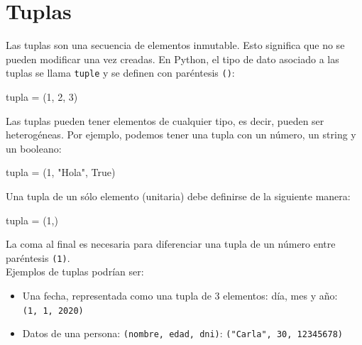 \documentclass[
  letterpaper,
  DIV=11,
  numbers=noendperiod]{scrreprt}
\newenvironment{Shaded}{\begin{snugshade}}{\end{snugshade}}
\newcommand{\DecValTok}[1]{\textcolor[rgb]{0.68,0.00,0.00}{#1}}
\newcommand{\NormalTok}[1]{\textcolor[rgb]{0.00,0.23,0.31}{#1}}
\newcommand{\OperatorTok}[1]{\textcolor[rgb]{0.37,0.37,0.37}{#1}}
\newcommand{\StringTok}[1]{\textcolor[rgb]{0.13,0.47,0.30}{#1}}
\newcommand{\VariableTok}[1]{\textcolor[rgb]{0.07,0.07,0.07}{#1}}
\providecommand{\tightlist}{%
  \setlength{\itemsep}{0pt}\setlength{\parskip}{0pt}}\usepackage{longtable,booktabs,array}
\begin{document}
\hypertarget{tuplas}{%
\section{Tuplas}\label{tuplas}}

Las tuplas son una secuencia de elementos inmutable. Esto significa que
no se pueden modificar una vez creadas. En Python, el tipo de dato
asociado a las tuplas se llama \texttt{tuple} y se definen con
paréntesis \texttt{()}:

\begin{Shaded}
\begin{Highlighting}[]
\NormalTok{tupla }\OperatorTok{=}\NormalTok{ (}\DecValTok{1}\NormalTok{, }\DecValTok{2}\NormalTok{, }\DecValTok{3}\NormalTok{)}
\end{Highlighting}
\end{Shaded}

Las tuplas pueden tener elementos de cualquier tipo, es decir, pueden
ser heterogéneas. Por ejemplo, podemos tener una tupla con un número, un
string y un booleano:

\begin{Shaded}
\begin{Highlighting}[]
\NormalTok{tupla }\OperatorTok{=}\NormalTok{ (}\DecValTok{1}\NormalTok{, }\StringTok{"Hola"}\NormalTok{, }\VariableTok{True}\NormalTok{)}
\end{Highlighting}
\end{Shaded}

Una tupla de un sólo elemento (unitaria) debe definirse de la siguiente
manera:

\begin{Shaded}
\begin{Highlighting}[]
\NormalTok{tupla }\OperatorTok{=}\NormalTok{ (}\DecValTok{1}\NormalTok{,)}
\end{Highlighting}
\end{Shaded}

La coma al final es necesaria para diferenciar una tupla de un número
entre paréntesis \texttt{(1)}.\\

Ejemplos de tuplas podrían ser:

\begin{itemize}
\tightlist
\item
  Una fecha, representada como una tupla de 3 elementos: día, mes y año:
  \texttt{(1,\ 1,\ 2020)}
\item
  Datos de una persona: \texttt{(nombre,\ edad,\ dni)}:
  \texttt{("Carla",\ 30,\ 12345678)}
\end{itemize}
\end{document}
